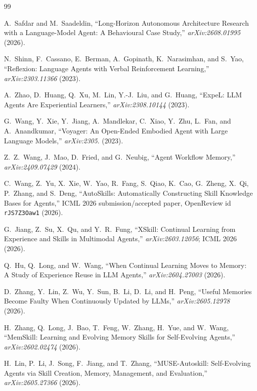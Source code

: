 \begin{thebibliography}{99}
\sloppy

A.~Safdar and M.~Saadeldin,
``Long-Horizon Autonomous Architecture Research with a Language-Model Agent: A Behavioural Case Study,''
\emph{arXiv:2608.01995} (2026).

N.~Shinn, F.~Cassano, E.~Berman, A.~Gopinath, K.~Narasimhan, and S.~Yao,
``Reflexion: Language Agents with Verbal Reinforcement Learning,''
\emph{arXiv:2303.11366} (2023).

A.~Zhao, D.~Huang, Q.~Xu, M.~Lin, Y.-J.~Liu, and G.~Huang,
``ExpeL: LLM Agents Are Experiential Learners,''
\emph{arXiv:2308.10144} (2023).

G.~Wang, Y.~Xie, Y.~Jiang, A.~Mandlekar, C.~Xiao, Y.~Zhu, L.~Fan, and A.~Anandkumar,
``Voyager: An Open-Ended Embodied Agent with Large Language Models,''
\emph{arXiv:2305.} (2023).

Z.~Z.~Wang, J.~Mao, D.~Fried, and G.~Neubig,
``Agent Workflow Memory,''
\emph{arXiv:2409.07429} (2024).

C.~Wang, Z.~Yu, X.~Xie, W.~Yao, R.~Fang, S.~Qiao, K.~Cao, G.~Zheng, X.~Qi, P.~Zhang, and S.~Deng,
``AutoSkills: Automatically Constructing Skill Knowledge Bases for Agents,''
ICML 2026 submission/accepted paper, OpenReview id \texttt{rJS7Z3Oaw1} (2026).

G.~Jiang, Z.~Su, X.~Qu, and Y.~R.~Fung,
``XSkill: Continual Learning from Experience and Skills in Multimodal Agents,''
\emph{arXiv:2603.12056}; ICML 2026 (2026).

Q.~Hu, Q.~Long, and W.~Wang,
``When Continual Learning Moves to Memory: A Study of Experience Reuse in LLM Agents,''
\emph{arXiv:2604.27003} (2026).

D.~Zhang, Y.~Lin, Z.~Wu, Y.~Sun, B.~Li, D.~Li, and H.~Peng,
``Useful Memories Become Faulty When Continuously Updated by LLMs,''
\emph{arXiv:2605.12978} (2026).

H.~Zhang, Q.~Long, J.~Bao, T.~Feng, W.~Zhang, H.~Yue, and W.~Wang,
``MemSkill: Learning and Evolving Memory Skills for Self-Evolving Agents,''
\emph{arXiv:2602.02474} (2026).

H.~Lin, P.~Li, J.~Song, F.~Jiang, and T.~Zhang,
``MUSE-Autoskill: Self-Evolving Agents via Skill Creation, Memory, Management, and Evaluation,''
\emph{arXiv:2605.27366} (2026).


\end{thebibliography}
